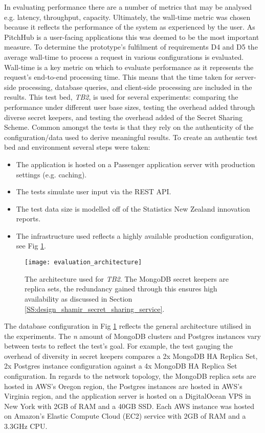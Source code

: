 In evaluating performance there are a number of metrics that may be analysed e.g. latency, throughput, capacity. Ultimately, the wall-time metric was chosen because it reflects the performance of the system as experienced by the user. As PitchHub is a user-facing applications this was deemed to be the most important measure. To determine the prototype's fulfilment of requirements D4 and D5 the average wall-time to process a request in various configurations is evaluated. Wall-time is a key metric on which to evaluate performance as it represents the request's end-to-end processing time. This means that the time taken for server-side processing, database queries, and client-side processing are included in the results. This test bed, \textit{TB2}, is used for several experiments: comparing the performance under different user base sizes, testing the overhead added through diverse secret keepers, and testing the overhead added of the Secret Sharing Scheme. Common amongst the tests is that they rely on the authenticity of the configuration/data used to derive meaningful results. To create an authentic test bed and environment several steps were taken:
\begin{itemize}  
    \item The application is hosted on a Passenger application server with production settings (e.g. caching).
    \item The tests simulate user input via the REST API.
    \item The test data size is modelled off of the Statistics New Zealand innovation reports.
    \item The infrastructure used reflects a highly available production configuration, see Fig \ref{fig:architecture_evaluation}.
\end{itemize}

\begin{figure}[ht]
    \centering
    \texttt{[image: evaluation\_architecture]}
    \caption{The architecture used for \textit{TB2}. The MongoDB secret keepers are replica sets, the redundancy gained through this ensures high availability as discussed in Section \ref{SS:design_shamir_secret_sharing_service}.}
    \label{fig:architecture_evaluation}
\end{figure}

The database configuration in Fig \ref{fig:architecture_evaluation} reflects the general architecture utilised in the experiments. The \textit{n} amount of MongoDB clusters and Postgres instances vary between tests to reflect the test's goal. For example, the test gauging the overhead of diversity in secret keepers compares a 2x MongoDB HA Replica Set, 2x Postgres instance configuration against a 4x MongoDB HA Replica Set configuration. In regards to the network topology, the MongoDB replica sets are hosted in AWS's Oregon region, the Postgres instances are hosted in AWS's Virginia region, and the application server is hosted on a DigitalOcean VPS in New York with 2GB of RAM and a 40GB SSD. Each AWS instance was hosted on Amazon's Elastic Compute Cloud (EC2) service with 2GB of RAM and a 3.3GHz CPU.

